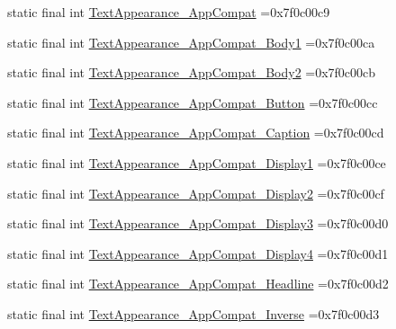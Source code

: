 \begin{DoxyCompactItemize}
\item 
static final int \mbox{\hyperlink{classbr_1_1unb_1_1cic_1_1mp_1_1marketmaster_1_1test_1_1R_1_1style_a42ed5073346cdfc36e7fb5153a896237}{Text\+Appearance\+\_\+\+App\+Compat}} =0x7f0c00c9
\item 
static final int \mbox{\hyperlink{classbr_1_1unb_1_1cic_1_1mp_1_1marketmaster_1_1test_1_1R_1_1style_a49ff6a0d1cf26bfaed1fdb5ee18b92d2}{Text\+Appearance\+\_\+\+App\+Compat\+\_\+\+Body1}} =0x7f0c00ca
\item 
static final int \mbox{\hyperlink{classbr_1_1unb_1_1cic_1_1mp_1_1marketmaster_1_1test_1_1R_1_1style_ae5d3d27742e396f7a674d4e969549a39}{Text\+Appearance\+\_\+\+App\+Compat\+\_\+\+Body2}} =0x7f0c00cb
\item 
static final int \mbox{\hyperlink{classbr_1_1unb_1_1cic_1_1mp_1_1marketmaster_1_1test_1_1R_1_1style_a17b6d57fe3fd482c828e4ece153e4465}{Text\+Appearance\+\_\+\+App\+Compat\+\_\+\+Button}} =0x7f0c00cc
\item 
static final int \mbox{\hyperlink{classbr_1_1unb_1_1cic_1_1mp_1_1marketmaster_1_1test_1_1R_1_1style_ae4c6f65d5d9d6e7b41c85f8fa2609519}{Text\+Appearance\+\_\+\+App\+Compat\+\_\+\+Caption}} =0x7f0c00cd
\item 
static final int \mbox{\hyperlink{classbr_1_1unb_1_1cic_1_1mp_1_1marketmaster_1_1test_1_1R_1_1style_ae931e39c7e7323de668c65f9df5f336d}{Text\+Appearance\+\_\+\+App\+Compat\+\_\+\+Display1}} =0x7f0c00ce
\item 
static final int \mbox{\hyperlink{classbr_1_1unb_1_1cic_1_1mp_1_1marketmaster_1_1test_1_1R_1_1style_a9f44c048e118a65d8cda563c622b7449}{Text\+Appearance\+\_\+\+App\+Compat\+\_\+\+Display2}} =0x7f0c00cf
\item 
static final int \mbox{\hyperlink{classbr_1_1unb_1_1cic_1_1mp_1_1marketmaster_1_1test_1_1R_1_1style_a1d0299390552259bde43a17f02cc10de}{Text\+Appearance\+\_\+\+App\+Compat\+\_\+\+Display3}} =0x7f0c00d0
\item 
static final int \mbox{\hyperlink{classbr_1_1unb_1_1cic_1_1mp_1_1marketmaster_1_1test_1_1R_1_1style_a2968efb6ea17862d57656115a6f796de}{Text\+Appearance\+\_\+\+App\+Compat\+\_\+\+Display4}} =0x7f0c00d1
\item 
static final int \mbox{\hyperlink{classbr_1_1unb_1_1cic_1_1mp_1_1marketmaster_1_1test_1_1R_1_1style_aaae322d4ca71b7bfa966c972f0acc690}{Text\+Appearance\+\_\+\+App\+Compat\+\_\+\+Headline}} =0x7f0c00d2
\item 
static final int \mbox{\hyperlink{classbr_1_1unb_1_1cic_1_1mp_1_1marketmaster_1_1test_1_1R_1_1style_a9131a3ac7c264d68139c355c7254de1c}{Text\+Appearance\+\_\+\+App\+Compat\+\_\+\+Inverse}} =0x7f0c00d3

\end{DoxyCompactItemize}
